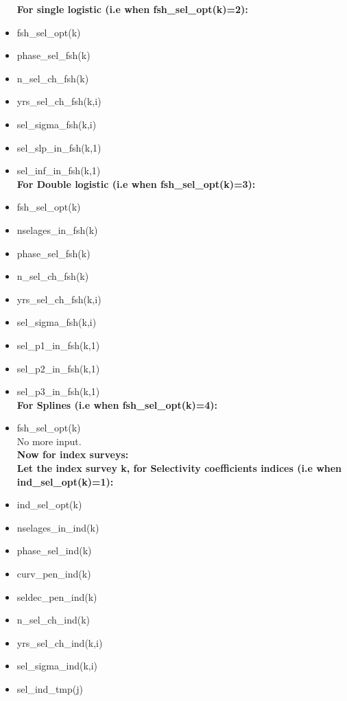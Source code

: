 \documentclass{article}
\begin{document}
\begin{itemize}
    \textbf{For single logistic (i.e when fsh\_sel\_opt(k)=2):}\\
    
    \item fsh\_sel\_opt(k)
    \item phase\_sel\_fsh(k)
    \item n\_sel\_ch\_fsh(k)
    \item yrs\_sel\_ch\_fsh(k,i)
    \item sel\_sigma\_fsh(k,i)
    \item sel\_slp\_in\_fsh(k,1)
    \item sel\_inf\_in\_fsh(k,1)\\
    
    \textbf{For Double logistic (i.e when fsh\_sel\_opt(k)=3):}\\
    
    \item fsh\_sel\_opt(k)
    \item nselages\_in\_fsh(k)
    \item phase\_sel\_fsh(k)
    \item n\_sel\_ch\_fsh(k)
    \item yrs\_sel\_ch\_fsh(k,i)
    \item sel\_sigma\_fsh(k,i)
    \item sel\_p1\_in\_fsh(k,1)
    \item sel\_p2\_in\_fsh(k,1)
    \item sel\_p3\_in\_fsh(k,1)\\
    
    \textbf{For Splines (i.e when fsh\_sel\_opt(k)=4):}\\
    
    \item fsh\_sel\_opt(k)\\
    No more input.\\
    
    \textbf{Now for index surveys:}\\
    
    \textbf{Let the index survey  k, for Selectivity coefficients indices (i.e when ind\_sel\_opt(k)=1):}\\
    
    \item ind\_sel\_opt(k)
    \item nselages\_in\_ind(k)
    \item phase\_sel\_ind(k)
    \item curv\_pen\_ind(k)
    \item seldec\_pen\_ind(k)
    \item n\_sel\_ch\_ind(k)
    \item yrs\_sel\_ch\_ind(k,i)
    \item sel\_sigma\_ind(k,i)
    \item sel\_ind\_tmp(j)\\
    

\end{itemize}
\end{document}
